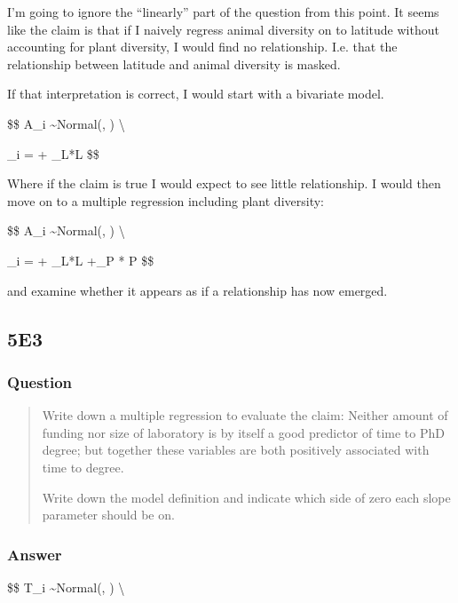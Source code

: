\documentclass[
]{book}
\begin{document}
I'm going to ignore the ``linearly'' part of the question from this point. It seems like the claim is that if I naively regress animal diversity on to latitude without accounting for plant diversity, I would find no relationship. I.e. that the relationship between latitude and animal diversity is masked.

If that interpretation is correct, I would start with a bivariate model.

\$\$
A\_i \sim Normal(\mu, \sigma) \textbackslash{}

\mu\_i = \alpha + \beta\_L*L
\$\$

Where if the claim is true I would expect to see little relationship. I would then move on to a multiple regression including plant diversity:

\$\$
A\_i \sim Normal(\mu, \sigma) \textbackslash{}

\mu\_i = \alpha + \beta\_L*L +\beta\_P * P
\$\$

and examine whether it appears as if a relationship has now emerged.

\hypertarget{e3-3}{%
\subsection*{5E3}\label{e3-3}}

\hypertarget{question-47}{%
\subsubsection*{Question}\label{question-47}}

\begin{quote}
Write down a multiple regression to evaluate the claim: Neither amount of funding nor size of laboratory is by itself a good predictor of time to PhD degree; but together these variables are both positively associated with time to degree.

Write down the model definition and indicate which side of zero each slope parameter should be on.
\end{quote}

\hypertarget{answer-47}{%
\subsubsection*{Answer}\label{answer-47}}

\$\$
T\_i \sim Normal(\mu, \sigma) \textbackslash{}
\end{document}
